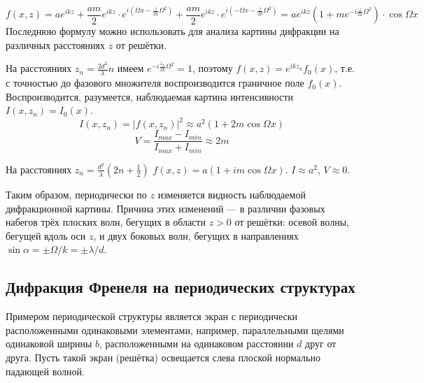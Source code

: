 \[
f(x,z) = ae^{ikz} + \frac{am}{2}e^{ikz} \cdot e^{i(\Omega x - \frac{z}{2k}\Omega^2)} + \frac{am}{2}e^{ikz} \cdot e^{i(-\Omega x - \frac{z}{2k}\Omega^2)} = ae^{ikz}\left(1 + me^{-i\frac{z}{2k}\Omega^2}\right)\cdot \cos \Omega x
\]
Последнюю формулу можно использовать для анализа картины дифракции на различных расстояниях $z$ от решётки.

На расстояниях $z_n = \frac{2d^2}{\lambda}n$ имеем $e^{-i\frac{z_n}{2k}\Omega^2} = 1$, поэтому $f(x, z) = e^{ikz_n}f_0(x)$, т.е. с точностью до фазового множителя воспроизводится граничное поле $f_0(x)$. Воспроизводится, разумеется, наблюдаемая картина интенсивности $I(x, z_n) = I_0(x)$.
\[
I(x, z_n) = |f(x, z_n)|^2 \approx a^2(1 + 2m\cos\Omega x)
\]
\[
V = \frac{I_{max} - I_{min}}{I_{max} + I_{min}} \approx 2m
\]

На расстояниях $z_n = \frac{d^2}{\lambda}(2n + \frac{1}{2})$ $f(x, z) = a(1 + im\cos\Omega x)$. $I \approx a^2$, $V \approx 0$.

Таким образом, периодически по $z$ изменяется видность наблюдаемой дифракционной картины. Причина этих изменений --- в различии фазовых набегов трёх плоских волн, бегущих в области $z > 0$ от решётки: осевой волны, бегущей вдоль оси $z$, и двух боковых волн, бегущих в направлениях $\sin\alpha = \pm \Omega / k = \pm \lambda / d$.

\subsection{Дифракция Френеля на периодических структурах}
Примером периодической структуры является экран с периодически расположенными одинаковыми элементами, например, параллельными щелями одинаковой ширины  $b$, расположенными на одинаковом расстоянии $d$ друг от друга. Пусть такой экран (решётка) освещается слева плоской нормально падающей волной.

